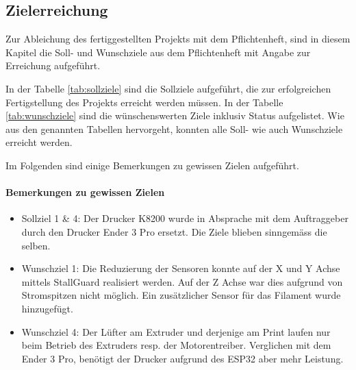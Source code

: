 \subsection{Zielerreichung}
\label{sec:Zielerreichung}

Zur Ableichung des fertiggestellten Projekts mit dem Pflichtenheft, sind in diesem Kapitel die Soll- und Wunschziele aus dem Pflichtenheft mit Angabe zur Erreichung aufgeführt.

In der Tabelle \ref{tab:sollziele} sind die Sollziele aufgeführt, die zur erfolgreichen Fertigstellung des Projekts erreicht werden müssen. In der Tabelle \ref{tab:wunschziele} sind die wünschenswerten Ziele inklusiv Status aufgelistet. Wie aus den genannten Tabellen hervorgeht, konnten alle Soll- wie auch Wunschziele erreicht werden.

Im Folgenden sind einige Bemerkungen zu gewissen Zielen aufgeführt.\\

\paragraph{Bemerkungen zu gewissen Zielen} 
\vspace{-4mm}
\begin{itemize}
	\item Sollziel 1 \& 4: Der Drucker K8200 wurde in Absprache mit dem Auftraggeber durch den Drucker Ender 3 Pro ersetzt. Die Ziele blieben sinngemäss die selben.
	\item Wunschziel 1: Die Reduzierung der Sensoren konnte auf der X und Y Achse mittels StallGuard realisiert werden. Auf der Z Achse war dies aufgrund von Stromspitzen nicht möglich. Ein zusätzlicher Sensor für das Filament wurde hinzugefügt.
	\item Wunschziel 4: Der Lüfter am Extruder und derjenige am Print laufen nur beim Betrieb des Extruders resp. der Motorentreiber. Verglichen mit dem Ender 3 Pro, benötigt der Drucker aufgrund des ESP32 aber mehr Leistung. 
\end{itemize}


